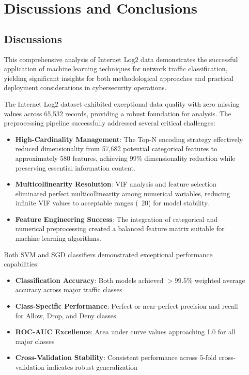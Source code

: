 \documentclass[12pt,a4paper]{article}
\begin{document}
\section{Discussions and Conclusions}

\subsection{Discussions}

This comprehensive analysis of Internet Log2 data demonstrates the successful application of machine learning techniques for network traffic classification, yielding significant insights for both methodological approaches and practical deployment considerations in cybersecurity operations.

The Internet Log2 dataset exhibited exceptional data quality with zero missing values across 65,532 records, providing a robust foundation for analysis. The preprocessing pipeline successfully addressed several critical challenges:

\begin{itemize}
    \item \textbf{High-Cardinality Management}: The Top-N encoding strategy effectively reduced dimensionality from 57,682 potential categorical features to approximately 580 features, achieving 99\% dimensionality reduction while preserving essential information content.
    \item \textbf{Multicollinearity Resolution}: VIF analysis and feature selection eliminated perfect multicollinearity among numerical variables, reducing infinite VIF values to acceptable ranges (~20) for model stability.
    \item \textbf{Feature Engineering Success}: The integration of categorical and numerical preprocessing created a balanced feature matrix suitable for machine learning algorithms.
\end{itemize}

Both SVM and SGD classifiers demonstrated exceptional performance capabilities:

\begin{itemize}
    \item \textbf{Classification Accuracy}: Both models achieved $>99.5\%$ weighted average accuracy across major traffic classes
    \item \textbf{Class-Specific Performance}: Perfect or near-perfect precision and recall for Allow, Drop, and Deny classes
    \item \textbf{ROC-AUC Excellence}: Area under curve values approaching 1.0 for all major classes
    \item \textbf{Cross-Validation Stability}: Consistent performance across 5-fold cross-validation indicates robust generalization
\end{itemize}
\end{document}
